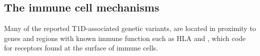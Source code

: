 
\subsection{The immune cell mechanisms}

Many of the reported T1D-associated genetic variants, are located in proximity to genes and regions with known immune function such as HLA and ,
which code for receptors found at the surface of immune cells.

